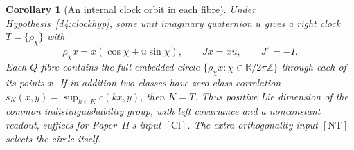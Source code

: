 \documentclass[11pt,reqno]{amsart}
\newtheorem{corollary}[theorem]{Corollary}
\theoremstyle{definition}
\theoremstyle{remark}
\numberwithin{equation}{section}
\begin{document}
\begin{corollary}[An internal clock orbit in each fibre]\label{d4:clock}
Under Hypothesis~\ref{d4:clockhyp}, some unit imaginary quaternion
\(u\) gives a right clock \(T=\{\rho_\chi\}\) with
\[
 \rho_\chi x=x(\cos\chi+u\sin\chi),\qquad
 Jx=xu,\qquad J^2=-I .
\]
Each \(Q\)-fibre contains the full embedded circle
\(\{\rho_\chi x:\chi\in\mathbb R/2\pi\mathbb Z\}\) through each of
its points \(x\). If in addition two classes have zero class-correlation
\(s_K(x,y)=\sup_{k\in K}c(kx,y)\), then \(K=T\).
Thus positive Lie dimension of the common indistinguishability group,
with left covariance and a nonconstant readout, suffices for Paper~II's
input \([\mathrm{Cl}]\). The extra orthogonality input \([\mathrm{NT}]\)
selects the circle itself.
\end{corollary}
\end{document}
